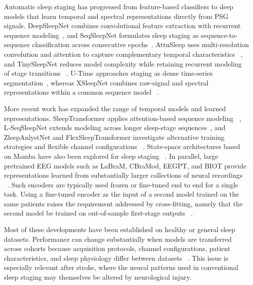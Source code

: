 \documentclass[a4paper,fleqn]{cas-sc}
\begin{document}
Automatic sleep staging has progressed from feature-based classifiers to deep
models that learn temporal and spectral representations directly from PSG
signals. DeepSleepNet combines convolutional feature extraction with recurrent sequence modeling~\cite{supratak2017deepsleepnet}, and SeqSleepNet formulates sleep staging as sequence-to-sequence classification across consecutive epochs~\cite{phan2019seqsleepnet}. AttnSleep uses multi-resolution convolution and
attention to capture complementary temporal characteristics
~\cite{eldele2021attnsleep}, and TinySleepNet reduces model complexity while
retaining recurrent modeling of stage transitions
~\cite{supratak2020tinysleepnet}. U-Time approaches staging as dense
time-series segmentation~\cite{perslev2019utime}, whereas XSleepNet combines
raw-signal and spectral representations within a common sequence model
~\cite{phan2021xsleepnet}.

More recent work has expanded the range of temporal models and learned
representations. SleepTransformer applies attention-based sequence modeling
~\cite{sleeptransformer2022}, L-SeqSleepNet extends modeling across longer
sleep-stage sequences~\cite{lseqsleepnet2023}, and ZleepAnlystNet and
FlexSleepTransformer investigate alternative training strategies and flexible
channel configurations
~\cite{jirakittayakorn2024zleep,guo2024flexsleep}. State-space architectures
based on Mamba have also been explored for sleep staging
~\cite{gu2023mamba,bitmamsleep2024}. In parallel, large pretrained EEG models
such as LaBraM, CBraMod, EEGPT, and BIOT provide representations learned from
substantially larger collections of neural recordings
~\cite{labram2024,cbramod2025,eegpt2024,biot2023}. Such encoders are typically
used frozen or fine-tuned end to end for a single task. Using a fine-tuned
encoder as the input of a second model trained on the same patients raises the
requirement addressed by cross-fitting, namely that the
second model be trained on out-of-sample first-stage outputs
~\cite{wolpert1992stacked,chernozhukov2018dml}.

Most of these developments have been established on healthy or general sleep
datasets. Performance can change substantially when models are transferred
across cohorts because acquisition protocols, channel configurations, patient
characteristics, and sleep physiology differ between datasets
~\cite{guillot2023transfer}. This issue is especially relevant after stroke,
where the neural patterns used in conventional sleep staging may themselves be
altered by neurological injury.
\end{document}
